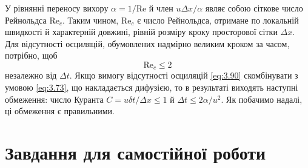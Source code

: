 У рівнянні переносу вихору $\alpha = 1 / \text{Re}$ й член $u \Delta x / \alpha$ являє собою сіткове число Рейнольдса $\text{Re}_c$. Таким чином, $\text{Re}_c$ є число Рейнольдса, отримане по локальній швидкості й характерній довжині, рівній розміру кроку просторової сітки $\Delta x$. Для відсутності осциляцій, обумовлених надмірно великим кроком за часом, потрібно, щоб
\begin{equation}
    \label{eq:3.91}
    \text{Re}_c \le 2
\end{equation}
незалежно від $\Delta t$. Якщо вимогу відсутності осциляцій \eqref{eq:3.90} скомбінувати з умовою \eqref{eq:3.73}, що накладається дифузією, то в результаті виходять наступні обмеження: число Куранта $C = u \delta t / \Delta x \le 1$ й $\Delta t \le 2 \alpha / u^2$. Як побачимо надалі, ці обмеження є правильними.

\section{Завдання для самостійної роботи}

